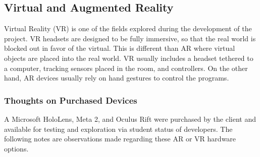
\subsection{Virtual and Augmented Reality}


    Virtual Reality (VR) is one of the fields explored during the development of the project.  VR headsets are designed to be fully immersive, so that the real world is blocked out in favor of the virtual.  This is different than AR where virtual objects are placed into the real world.  VR usually includes a headset tethered to a computer, tracking sensors placed in the room, and controllers.  On the other hand, AR devices usually rely on hand gestures to control the programs.

	

    

    \subsubsection{Thoughts on Purchased Devices}

    A Microsoft HoloLens, Meta 2, and Oculus Rift were purchased by the client and available for testing and exploration via student status of developers. The following notes are observations made regarding these AR or VR hardware options.

